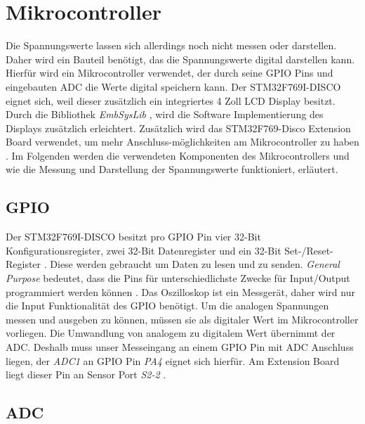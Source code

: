 \section{Mikrocontroller}
\label{Mikrocontroller}

Die Spannungswerte lassen sich allerdings noch nicht messen oder darstellen.
Daher wird ein Bauteil benötigt, das die Spannungswerte digital darstellen kann.
Hierfür wird ein Mikrocontroller verwendet, der durch seine GPIO Pins und eingebauten ADC die Werte digital speichern kann.
Der STM32F769I-DISCO eignet sich, weil dieser zusätzlich ein integriertes 4 Zoll LCD Display
besitzt\cite{MikroControllerDatasheet_1}.
Durch die Bibliothek \textit{EmbSysLib} \cite{EmbSysLib}, wird die Software Implementierung des Displays zusätzlich
erleichtert. Zusätzlich wird das STM32F769-Disco Extension Board verwendet, um mehr
Anschluss-möglichkeiten am Mikrocontroller zu haben \cite{MikrocontrollerExtension}.
Im Folgenden werden die verwendeten Komponenten des Mikrocontrollers und wie die Messung und
Darstellung der Spannungswerte funktioniert, erläutert.

\subsection{GPIO}
Der STM32F769I-DISCO besitzt pro GPIO Pin vier 32-Bit Konfigurationsregister, zwei 32-Bit Datenregister
und ein 32-Bit Set-/Reset-Register \cite{MikroControllerDatasheet_1}.
Diese werden gebraucht um Daten zu lesen und zu senden.
\textit{General Purpose} bedeutet, dass die Pins für unterschiedlichste Zwecke für
Input/Output programmiert werden können \cite{RPI-GPIO}. \newline
Das Oszilloskop ist ein Messgerät, daher wird nur die Input Funktionalität des GPIO benötigt.
Um die analogen Spannungen messen und ausgeben zu können, müssen sie als digitaler Wert
im Mikrocontroller vorliegen. \newline
Die Umwandlung von analogem zu digitalem Wert übernimmt der ADC\cite{MikroControllerDatasheet_1}.
Deshalb muss unser Messeingang an einem GPIO Pin mit ADC Anschluss liegen, der \textit{ADC1} an GPIO Pin
\textit{PA4} eignet sich hierfür\cite{STM32F769_PinLayout, MikroControllerDatasheet_Pins}.
Am Extension Board liegt dieser Pin an Sensor Port \textit{S2-2} \cite{MikrocontrollerExtension}.


\subsection{ADC}

